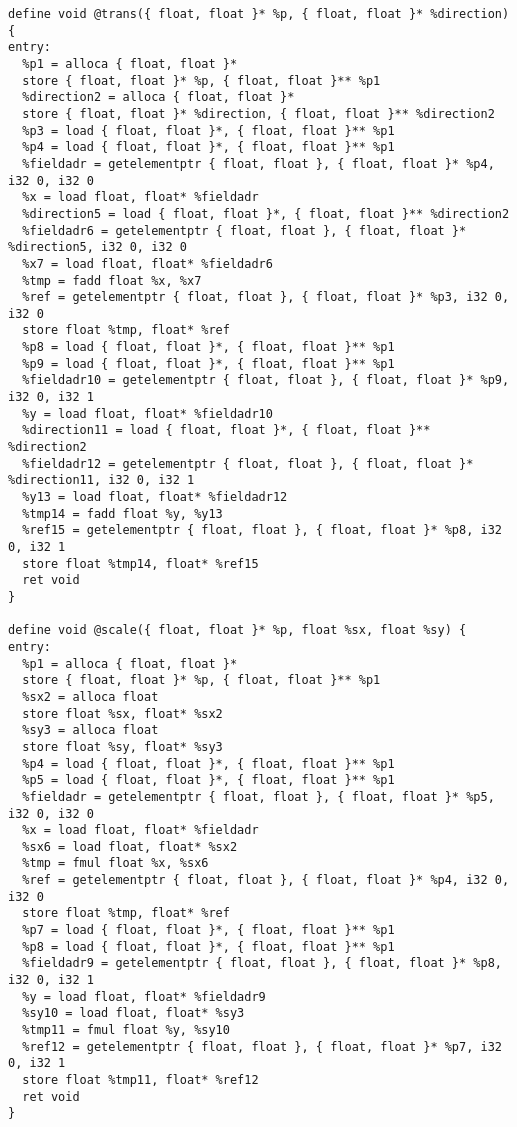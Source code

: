 \documentclass[main.tex]{subfiles}
\begin{document}
{\begin{lstlisting}
define void @trans({ float, float }* %p, { float, float }* %direction) {
entry:
  %p1 = alloca { float, float }*
  store { float, float }* %p, { float, float }** %p1
  %direction2 = alloca { float, float }*
  store { float, float }* %direction, { float, float }** %direction2
  %p3 = load { float, float }*, { float, float }** %p1
  %p4 = load { float, float }*, { float, float }** %p1
  %fieldadr = getelementptr { float, float }, { float, float }* %p4, i32 0, i32 0
  %x = load float, float* %fieldadr
  %direction5 = load { float, float }*, { float, float }** %direction2
  %fieldadr6 = getelementptr { float, float }, { float, float }* %direction5, i32 0, i32 0
  %x7 = load float, float* %fieldadr6
  %tmp = fadd float %x, %x7
  %ref = getelementptr { float, float }, { float, float }* %p3, i32 0, i32 0
  store float %tmp, float* %ref
  %p8 = load { float, float }*, { float, float }** %p1
  %p9 = load { float, float }*, { float, float }** %p1
  %fieldadr10 = getelementptr { float, float }, { float, float }* %p9, i32 0, i32 1
  %y = load float, float* %fieldadr10
  %direction11 = load { float, float }*, { float, float }** %direction2
  %fieldadr12 = getelementptr { float, float }, { float, float }* %direction11, i32 0, i32 1
  %y13 = load float, float* %fieldadr12
  %tmp14 = fadd float %y, %y13
  %ref15 = getelementptr { float, float }, { float, float }* %p8, i32 0, i32 1
  store float %tmp14, float* %ref15
  ret void
}

define void @scale({ float, float }* %p, float %sx, float %sy) {
entry:
  %p1 = alloca { float, float }*
  store { float, float }* %p, { float, float }** %p1
  %sx2 = alloca float
  store float %sx, float* %sx2
  %sy3 = alloca float
  store float %sy, float* %sy3
  %p4 = load { float, float }*, { float, float }** %p1
  %p5 = load { float, float }*, { float, float }** %p1
  %fieldadr = getelementptr { float, float }, { float, float }* %p5, i32 0, i32 0
  %x = load float, float* %fieldadr
  %sx6 = load float, float* %sx2
  %tmp = fmul float %x, %sx6
  %ref = getelementptr { float, float }, { float, float }* %p4, i32 0, i32 0
  store float %tmp, float* %ref
  %p7 = load { float, float }*, { float, float }** %p1
  %p8 = load { float, float }*, { float, float }** %p1
  %fieldadr9 = getelementptr { float, float }, { float, float }* %p8, i32 0, i32 1
  %y = load float, float* %fieldadr9
  %sy10 = load float, float* %sy3
  %tmp11 = fmul float %y, %sy10
  %ref12 = getelementptr { float, float }, { float, float }* %p7, i32 0, i32 1
  store float %tmp11, float* %ref12
  ret void
}


\end{lstlisting}}
\end{document}
